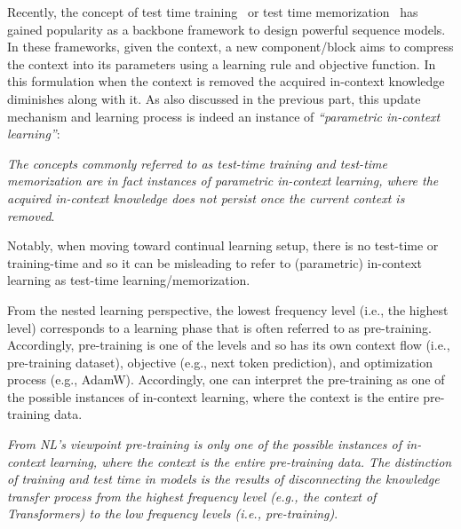 {
Recently, the concept of test time training~\citep{sun2024learning, wang2025test} or test time memorization~\citep{behrouz2025Miras} has gained popularity as a backbone framework to design powerful sequence models. In these frameworks, given the context, a new component/block aims to compress the context into its parameters using a learning rule and objective function. In this formulation when the context is removed the acquired in-context knowledge diminishes along with it. As also discussed in the previous part, this update mechanism and learning process is indeed an instance of \emph{``parametric in-context learning''}:  





\begin{myboxismall}
    \textit{The concepts commonly referred to as test-time training and test-time memorization are in fact instances of parametric in-context learning, where the acquired in-context knowledge does not persist once the current context is removed}. 
\end{myboxismall}

Notably, when moving toward continual learning setup, there is no test-time or training-time and so it can be misleading to refer to (parametric) in-context learning as test-time learning/memorization. 


From the nested learning perspective, the lowest frequency level (i.e., the highest level) corresponds to a learning phase that is often referred to as pre-training. Accordingly, pre-training is one of the levels and so has its own context flow (i.e., pre-training dataset), objective (e.g., next token prediction), and optimization process (e.g., AdamW). Accordingly, one can interpret the pre-training as one of the possible instances of in-context learning, where the context is the entire pre-training data. 


\begin{myboxismall}  
    \textit{From NL's viewpoint pre-training is only one of the possible instances of in-context learning, where the context is the entire pre-training data. The distinction of training and test time in models is the results of disconnecting the knowledge transfer process from the highest frequency level (e.g., the context of Transformers) to the low frequency levels (i.e., pre-training)}.
\end{myboxismall}

}
